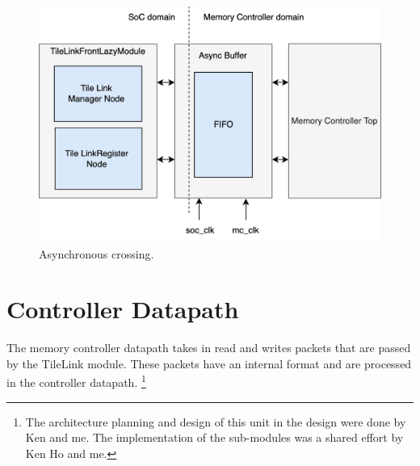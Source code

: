 \begin{figure}[h]
    \centering
    \includegraphics[scale=0.2]{images/cdc.jpg}
    \caption{Asynchronous crossing.}
    \label{fig:cdc}
\end{figure}
\newpage
\section{Controller Datapath}
The memory controller datapath takes in read and writes packets that are passed by the TileLink module. These packets have an internal format and are processed in the controller datapath. \footnote{The architecture planning and design of this unit in the design were done by Ken and me. The implementation of the sub-modules was a shared effort by Ken Ho and me.} 

